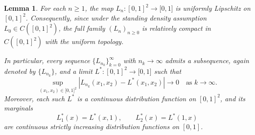 \documentclass[onecolumn]{article}
\newtheorem{lemma}[theorem]{Lemma}
\begin{document}
\begin{lemma}
\noindent \label{L-Lip} For each $n\geq 1$, the map $L_{n}:[0,1]^{2}%
\rightarrow \lbrack 0,1]$ is uniformly Lipschitz on $[0,1]^{2}$.
Consequently, since under the standing density assumption $L_{0}\in
C([0,1]^{2})$, the full family $(L_{n})_{n\geq 0}$ is relatively compact in $%
C([0,1]^{2})$ with the uniform topology.

In particular, every sequence $\{L_{n_{k}}\}_{k=0}^{\infty }$ with $%
n_{k}\rightarrow \infty $ admits a subsequence, again denoted by $%
\{L_{n_{k}}\}$, and a limit $L^{\ast }:[0,1]^{2}\rightarrow \lbrack 0,1]$
such that 
\begin{equation}
\sup_{(x_{1},x_{2})\in \lbrack 0,1]^{2}}\left\vert
L_{n_{k}}(x_{1},x_{2})-L^{\ast }(x_{1},x_{2})\right\vert \rightarrow 0\quad 
\text{as }k\rightarrow \infty .  \label{900}
\end{equation}%
Moreover, each such $L^{\ast }$ is a continuous distribution function on $%
[0,1]^{2}$, and its marginals 
\begin{equation}
L_{1}^{\ast }(x)=L^{\ast }(x,1),\qquad L_{2}^{\ast }(x)=L^{\ast }(1,x)
\label{5000}
\end{equation}%
are continuous strictly increasing distribution functions on $[0,1]$.
\end{lemma}
\end{document}
